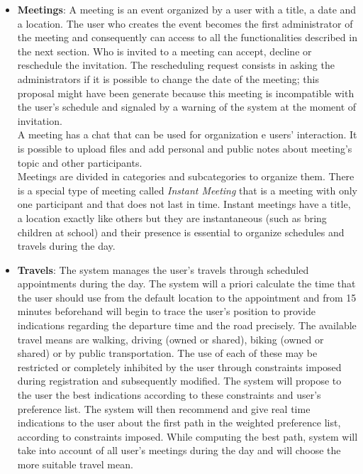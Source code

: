 \begin{itemize}
	\item \textbf{{Meetings}}: A meeting is an event organized by a user with a title, a date and a location. The user who creates the event becomes the first administrator of the meeting and consequently can access to all the functionalities described in the next section. Who is invited to a meeting can accept, decline or reschedule the invitation. The rescheduling request consists in asking the administrators if it is possible to change the date of the meeting; this proposal might have been generate because this meeting is incompatible with the user's schedule and signaled by a warning of the system at the moment of invitation. \\
	A meeting has a chat that can be used for organization e users' interaction. It is possible to upload files and add personal and public notes about meeting's topic and other participants.\\
	Meetings are divided in categories and subcategories to organize them. There is a special type of meeting called \textit{Instant Meeting }that is a meeting with only one participant and that does not last in time. Instant meetings have a title, a location exactly like others but they are instantaneous (such as bring children at school) and their presence is essential to organize schedules and travels during the day.
		
	\item \textbf{{Travels}}: The system manages the user's travels through scheduled appointments during the day. The system will a priori calculate the time that the user should use from the default location to the appointment and from 15 minutes beforehand will begin to trace the user's position to provide indications regarding the departure time and the road precisely. The available travel means are walking, driving (owned or shared), biking (owned or shared) or by public transportation.  The use of each of these may be restricted or completely inhibited by the user through constraints imposed during registration and subsequently modified. The system will propose to the user the best indications according to these constraints and user's preference list. The system will then recommend and give real time indications to the user about the first path in the weighted preference list, according to constraints imposed. While computing the best path, system will take into account of all user's meetings during the day and will choose the more suitable travel mean.
\end{itemize}